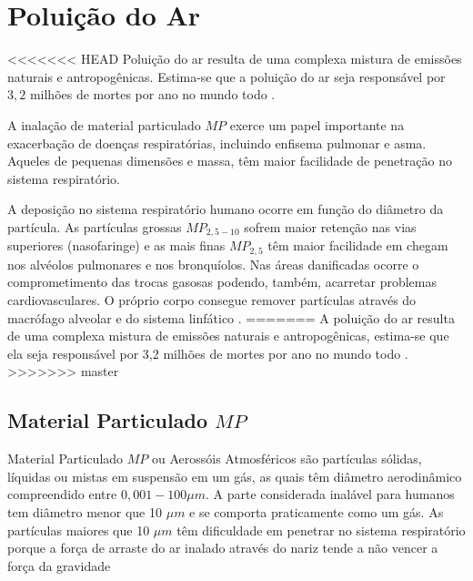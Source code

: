 \section{Poluição do Ar}

<<<<<<< HEAD
Poluição do ar resulta de uma complexa mistura de emissões naturais e 
antropogênicas. Estima-se que a poluição do ar seja responsável por 
$3,2$ milhões de mortes por ano no mundo todo \citep{lim2013}.%

A inalação de material particulado $MP$ exerce um papel importante na 
exacerbação de doenças respiratórias, incluindo enfisema pulmonar e asma. 
Aqueles de pequenas dimensões e massa, têm maior facilidade de penetração no sistema 
respiratório. 

A deposição no sistema respiratório humano ocorre em função do diâmetro da 
partícula.
As partículas grossas $MP_{2,5-10}$ sofrem maior retenção nas vias superiores (nasofaringe) e
as mais finas $MP_{2,5}$ têm maior facilidade em chegam nos alvéolos pulmonares e 
nos bronquíolos.
Nas áreas danificadas ocorre o comprometimento das trocas gasosas podendo, 
também, acarretar problemas cardiovasculares.
O próprio corpo consegue remover partículas através do macrófago alveolar 
e do sistema linfático \citep{arbex2012}.
=======
A poluição do ar resulta de uma complexa mistura de emissões naturais e 
antropogênicas, estima-se que ela seja responsável por 3,2 milhões de mortes 
por ano no mundo todo \citep{lim2013}. 
>>>>>>> master


\subsection{Material Particulado $MP$}

Material Particulado $MP$ ou Aerossóis Atmosféricos são partículas
sólidas, líquidas ou mistas em suspensão em um gás, as quais têm diâmetro 
aerodinâmico compreendido  entre $0,001-100\mu m$. 
A parte considerada inalável para humanos tem diâmetro menor que 10 $\mu m$
e se comporta praticamente como um gás.
As partículas maiores que 10 $\mu m$ têm dificuldade em penetrar 
no sistema respiratório porque a força de arraste do ar inalado 
através do nariz tende a não vencer a força da gravidade \citep{seinfeld2012}


